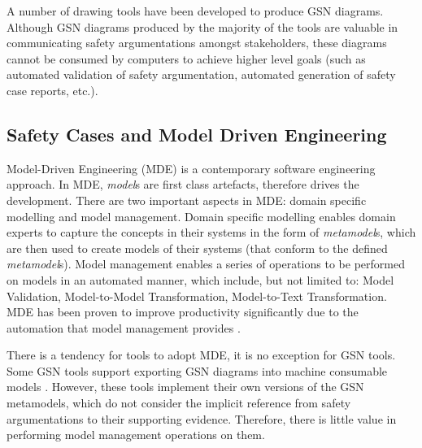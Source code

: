 A number of drawing tools have been developed \cite{asce, iscade, yorkgsn, certWare, astahGSN} to produce GSN diagrams. Although GSN diagrams produced by the majority of the tools are valuable in communicating safety argumentations amongst stakeholders, these diagrams cannot be consumed by computers to achieve higher level goals (such as automated validation of safety argumentation, automated generation of safety case reports, etc.). 


\subsection{Safety Cases and Model Driven Engineering}
Model-Driven Engineering (MDE) is a contemporary software engineering approach. In MDE, \textit{model}s are first class artefacts, therefore drives the development. There are two important aspects in MDE: domain specific modelling and model management. Domain specific modelling enables domain experts to capture the concepts in their systems in the form of \textit{metamodel}s, which are then used to create models of their systems (that conform to the defined \textit{metamodel}s). Model management enables a series of operations to be performed on models in an automated manner, which include, but not limited to: Model Validation, Model-to-Model Transformation, Model-to-Text Transformation. MDE has been proven to improve productivity significantly due to the automation that model management provides \cite{jaaksi2002developing, karna2009evaluating}. 

There is a tendency for tools to adopt MDE, it is no exception for GSN tools. Some GSN tools support exporting GSN diagrams into machine consumable models \cite{certWare, astahGSN}. However, these tools implement their own versions of the GSN metamodels, which do not consider the implicit reference from safety argumentations to their supporting evidence. Therefore, there is little value in performing model management operations on them.


%

